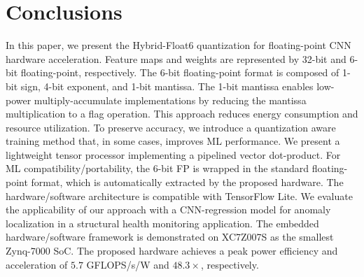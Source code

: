 \section{Conclusions}
\label{sec:conclusions}
In this paper, we present the Hybrid-Float6 quantization for floating-point CNN hardware acceleration. Feature maps and weights are represented by 32-bit and 6-bit floating-point, respectively. The 6-bit floating-point format is composed of 1-bit sign, 4-bit exponent, and 1-bit mantissa. The 1-bit mantissa enables low-power multiply-accumulate implementations by reducing the mantissa multiplication to a flag operation. This approach reduces energy consumption and resource utilization. To preserve accuracy, we introduce a quantization aware training method that, in some cases, improves ML performance. We present a lightweight tensor processor implementing a pipelined vector dot-product. For ML compatibility/portability, the 6-bit FP is wrapped in the standard floating-point format, which is automatically extracted by the proposed hardware. The hardware/software architecture is compatible with TensorFlow Lite. We evaluate the applicability of our approach with a CNN-regression model for anomaly localization in a structural health monitoring application. The embedded hardware/software framework is demonstrated on XC7Z007S as the smallest Zynq-7000 SoC. The proposed hardware achieves a peak power efficiency and acceleration of $5.7$ GFLOPS/s/W and $48.3\times$, respectively.